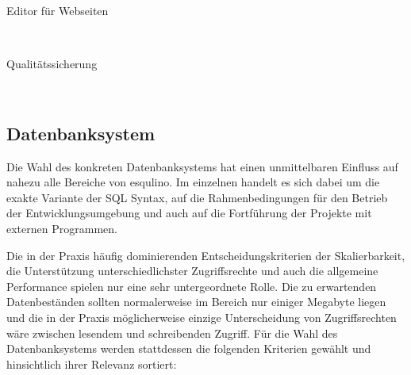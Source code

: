 \begin{description}
\item [Editor für Webseiten] \hfill \\

\item [Qualitätssicherung] \hfill \\
  
\end{description}

\subsection{Datenbanksystem}
\label{sec:implementation-database-system}

Die Wahl des konkreten Datenbanksystems hat einen unmittelbaren Einfluss auf nahezu alle Bereiche von esqulino. Im einzelnen handelt es sich dabei um die exakte Variante der SQL Syntax, auf die Rahmenbedingungen für den Betrieb der Entwicklungsumgebung und auch auf die Fortführung der Projekte mit externen Programmen.

Die in der Praxis häufig dominierenden Entscheidungskriterien der Skalierbarkeit, die Unterstützung unterschiedlichster Zugriffsrechte und auch die allgemeine Performance spielen nur eine sehr untergeordnete Rolle. Die zu erwartenden Datenbeständen sollten normalerweise im Bereich nur einiger Megabyte liegen und die in der Praxis möglicherweise einzige Unterscheidung von Zugriffsrechten wäre zwischen lesendem und schreibenden Zugriff. Für die Wahl des Datenbanksystems werden stattdessen die folgenden Kriterien gewählt und hinsichtlich ihrer Relevanz sortiert:

